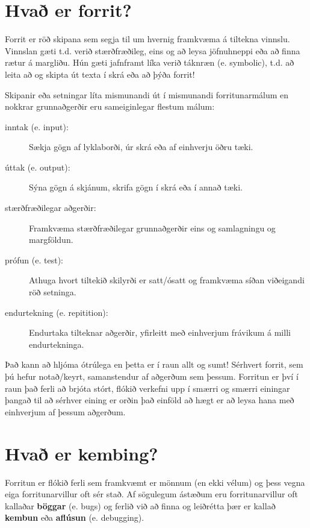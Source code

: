 \section{Hvað er forrit?}

Forrit er röð skipana sem segja til um hvernig framkvæma á tiltekna vinnslu.
Vinnslan gæti t.d. verið stærðfræðileg, eins og að leysa jöfnuhneppi eða að finna rætur á margliðu.
Hún gæti jafnframt líka verið táknræn (e. symbolic), t.d. að leita að og skipta út texta í skrá eða að þýða forrit!


Skipanir eða setningar líta mismunandi út í mismunandi forritunarmálum en nokkrar grunnaðgerðir eru sameiginlegar flestum málum:

\begin{description}

\item[inntak (e. input):] Sækja gögn af lyklaborði, úr skrá eða af einhverju öðru tæki.

\item[úttak (e. output):] Sýna gögn á skjánum, skrifa gögn í skrá eða í annað tæki. 

\item[stærðfræðilegar aðgerðir:] Framkvæma stærðfræðilegar grunnaðgerðir eins og samlagningu og margföldun.

\item[prófun (e. test):] Athuga hvort tiltekið skilyrði er satt/ósatt og framkvæma síðan viðeigandi röð setninga.

\item[endurtekning (e. repitition):] Endurtaka tilteknar aðgerðir, yfirleitt með einhverjum frávikum á milli endurtekninga.

\end{description}

Það kann að hljóma ótrúlega en þetta er í raun allt og sumt!
Sérhvert forrit, sem þú hefur notað/keyrt, samanstendur af aðgerðum sem þessum.
Forritun er því í raun það ferli að brjóta stórt, flókið verkefni upp í smærri og smærri einingar þangað til að sérhver eining er orðin það einföld að hægt er að leysa hana með einhverjum af þessum aðgerðum.

\section{Hvað er kembing?}

Forritun er flókið ferli sem framkvæmt er mönnum (en ekki vélum) og þess vegna eiga forritunarvillur oft sér stað.
Af sögulegum ástæðum eru forritunarvillur oft kallaðar {\bf böggar} (e. bugs) og ferlið við að finna og leiðrétta þær er kallað {\bf kembun} eða {\bf aflúsun} (e. debugging).

